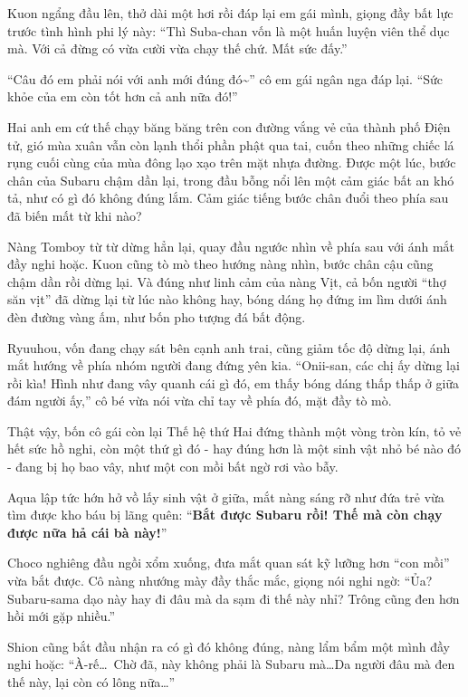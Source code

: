 \documentclass[../main.tex]{subfiles}
\begin{document}
Kuon ngẩng đầu lên, thở dài một hơi rồi đáp lại em gái mình, giọng đầy bất lực trước tình hình phi lý này: ``Thì Suba-chan vốn là một huấn luyện viên thể dục mà. Với cả đừng có vừa cười vừa chạy thế chứ. Mất sức đấy.''

``Câu đó em phải nói với anh mới đúng đó\~{}'' cô em gái ngân nga đáp lại. ``Sức khỏe của em còn tốt hơn cả anh nữa đó!''

Hai anh em cứ thế chạy băng băng trên con đường vắng vẻ của thành phố Điện tử, gió mùa xuân vẫn còn lạnh thổi phần phật qua tai, cuốn theo những chiếc lá rụng cuối cùng của mùa đông lạo xạo trên mặt nhựa đường. Được một lúc, bước chân của Subaru chậm dần lại, trong đầu bỗng nổi lên một cảm giác bất an khó tả, như có gì đó không đúng lắm. Cảm giác tiếng bước chân đuổi theo phía sau đã biến mất từ khi nào?

Nàng Tomboy từ từ dừng hẳn lại, quay đầu ngước nhìn về phía sau với ánh mắt đầy nghi hoặc. Kuon cũng tò mò theo hướng nàng nhìn, bước chân cậu cũng chậm dần rồi dừng lại. Và đúng như linh cảm của nàng Vịt, cả bốn người ``thợ săn vịt'' đã dừng lại từ lúc nào không hay, bóng dáng họ đứng im lìm dưới ánh đèn đường vàng ấm, như bốn pho tượng đá bất động.

Ryuuhou, vốn đang chạy sát bên cạnh anh trai, cũng giảm tốc độ dừng lại, ánh mắt hướng về phía nhóm người đang đứng yên kia. ``Onii-san, các chị ấy dừng lại rồi kìa! Hình như đang vây quanh cái gì đó, em thấy bóng dáng thấp thấp ở giữa đám người ấy,'' cô bé vừa nói vừa chỉ tay về phía đó, mặt đầy tò mò.

Thật vậy, bốn cô gái còn lại Thế hệ thứ Hai đứng thành một vòng tròn kín, tỏ vẻ hết sức hồ nghi, còn một thứ gì đó - hay đúng hơn là một sinh vật nhỏ bé nào đó - đang bị họ bao vây, như một con mồi bất ngờ rơi vào bẫy.


Aqua lập tức hớn hở vồ lấy sinh vật ở giữa, mắt nàng sáng rỡ như đứa trẻ vừa tìm được kho báu bị lãng quên: ``\textbf{Bắt được Subaru rồi! Thế mà còn chạy được nữa hả cái bà này!}''

Choco nghiêng đầu ngồi xổm xuống, đưa mắt quan sát kỹ lưỡng hơn ``con mồi'' vừa bắt được. Cô nàng nhướng mày đầy thắc mắc, giọng nói nghi ngờ: ``Ủa? Subaru-sama dạo này hay đi đâu mà da sạm đi thế này nhỉ? Trông cũng đen hơn hồi mới gặp nhiều.''

Shion cũng bắt đầu nhận ra có gì đó không đúng, nàng lẩm bẩm một mình đầy nghi hoặc: ``À-rế\dots\ Chờ đã, này không phải là Subaru mà\dots Da người đâu mà đen thế này, lại còn có lông nữa\dots''
\end{document}
